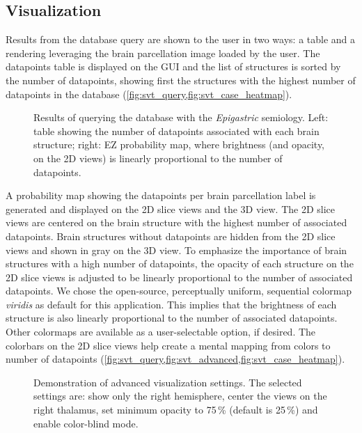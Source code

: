 \subsection{Visualization}
\label{sec:svt_visualization}

Results from the database query are shown to the user in two ways: a table and a rendering leveraging the brain parcellation image loaded by the user.
The datapoints table is displayed on the \ac{GUI} and the list of structures is sorted by the number of datapoints, showing first the structures with the highest number of datapoints in the database (\cref{fig:svt_query,fig:svt_case_heatmap}).

\begin{figure}
  \centering
  \caption[Results of querying the database with the \textit{Epigastric} semiology]{
    Results of querying the database with the \textit{Epigastric} semiology.
    Left: table showing the number of datapoints associated with each brain structure;
    right: \acf{EZ} probability map, where brightness (and opacity, on the 2D views) is linearly proportional to the number of datapoints.
  }
  \label{fig:svt_query}
\end{figure}

A probability map showing the datapoints per brain parcellation label is generated and displayed on the 2D slice views and the 3D view.
The 2D slice views are centered on the brain structure with the highest number of associated datapoints.
Brain structures without datapoints are hidden from the 2D slice views and shown in gray on the 3D view.
To emphasize the importance of brain structures with a high number of datapoints, the opacity of each structure on the 2D slice views is adjusted to be linearly proportional to the number of associated datapoints.
We chose the open-source, perceptually uniform, sequential colormap \textit{viridis} as default for this application.
This implies that the brightness of each structure is also linearly proportional to the number of associated datapoints.
Other colormaps are available as a user-selectable option, if desired.
The colorbars on the 2D slice views help create a mental mapping from colors to number of datapoints (\cref{fig:svt_query,fig:svt_advanced,fig:svt_case_heatmap}).

\begin{figure}
  \centering
  \caption[Demonstration of advanced visualization settings]{
    Demonstration of advanced visualization settings.
    The selected settings are:
    show only the right hemisphere,
    center the views on the right thalamus,
    set minimum opacity to 75\,\% (default is 25\,\%)
    and enable color-blind mode.
  }
  \label{fig:svt_advanced}
\end{figure}

